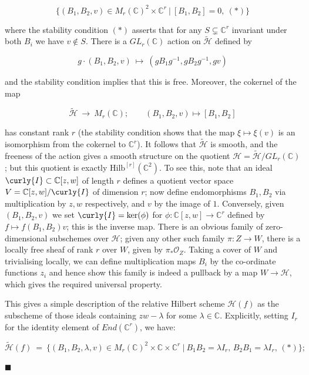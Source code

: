 \documentclass[10pt]{article}
\newcommand{\cc}{\mathbb{C}}
\newcommand{\Hilb}{\mathrm{Hilb}}
\newenvironment{Pf}{\par \noindent{\sc Proof:} }{\quad $\blacksquare$ \par
\vspace{0.5cm}}
\begin{document}
\begin{Pf}
$$\big \{ (B_1, B_2, v) \in M_r(\cc)^2 \times \cc^r \ | \ [B_1, B_2] =
0, \ (*) \big \}$$

\noindent where the stability condition $(*)$ asserts that for any $S
\subsetneq \cc^r$ invariant under both $B_i$ we have $v \not \in S$.
There is a $GL_r(\cc)$ action on $\tilde{\mathcal{H}}$ defined by

$$g \cdot (B_1, B_2, v) \ \mapsto \ (gB_1g^{-1}, gB_2g^{-1}, gv)$$

\noindent and the stability condition implies that this is free.
Moreover, the cokernel of the map 

$$\tilde{\mathcal{H}} \ \rightarrow \ M_r(\cc); \qquad (B_1, B_2, v)
\mapsto [B_1, B_2]$$

\noindent has constant rank $r$ (the stability condition shows that
the map $\xi \mapsto \xi(v)$ is an isomorphism from the cokernel to
$\cc^r$). It follows that $\tilde{\mathcal{H}}$ is
smooth, and the freeness of the action gives a smooth structure on the
quotient $\mathcal{H} = \tilde{\mathcal{H}}/GL_r(\cc)$; but this
quotient is exactly $\Hilb^{[r]}(\cc^2)$.  To see this, note that an
ideal $\curly{I} \subset \cc[z,w]$ of length $r$ defines a quotient
vector space  $V = \cc[z,w] / \curly{I}$ of dimension $r$; now define
endomorphisms $B_1, B_2$ via 
multiplication by $z,w$ respectively, and $v$ by the image of $1$.
Conversely, given $(B_1, B_2, v)$ we set $\curly{I} = \ker (\phi)$ for
$\phi: \cc[z,w] \rightarrow \cc^r$ defined by $f \mapsto f(B_1,
B_2)v$; this is the inverse map.  There is an obvious family of
zero-dimensional subschemes over $\mathcal{H}$; given any other such
family $\pi:Z \rightarrow W$, there is a locally free sheaf of rank
$r$ over $W$, given by $\pi_* \mathcal{O}_Z$.  Taking a cover of $W$
and trivialising locally, we can define multiplication maps $B_i$ by the
co-ordinate functions $z_i$ and hence show this family is indeed a
pullback by a map $W \rightarrow \mathcal{H}$, which gives the
required universal property.

\vspace{0.2cm}

\noindent This gives a simple description of the relative Hilbert scheme
$\mathcal{H}(f)$ as the subscheme of those ideals containing
$zw-\lambda$ for some $\lambda \in \cc$.  Explicitly, setting $I_r$
for the identity element of $End(\cc^r)$, we have:

$$\tilde{\mathcal{H}}(f) \ = \ \big \{ (B_1, B_2, \lambda, v) \in
M_r(\cc)^2 \times \cc \times \cc^r \ | \ B_1 B_2 = \lambda I_r, \,
B_2 B_1 = \lambda I_r, \, (*) \big \};$$


\end{Pf}
\end{document}
